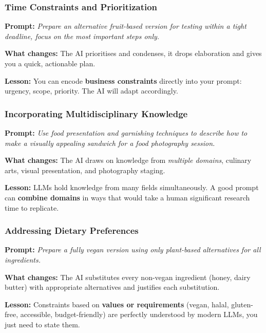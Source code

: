\begin{frame}[fragile]\frametitle{Time Constraints and Prioritization}

\textbf{Prompt:} \emph{Prepare an alternative fruit-based version for testing within a tight deadline, focus on the most important steps only.}

\medskip
\textbf{What changes:} The AI prioritises and condenses, it drops elaboration and gives you a quick, actionable plan.

\medskip
\textbf{Lesson:} You can encode \textbf{business constraints} directly into your prompt: urgency, scope, priority. The AI will adapt accordingly.

\end{frame}

\begin{frame}[fragile]\frametitle{Incorporating Multidisciplinary Knowledge}

\textbf{Prompt:} \emph{Use food presentation and garnishing techniques to describe how to make a visually appealing sandwich for a food photography session.}

\medskip
\textbf{What changes:} The AI draws on knowledge from \emph{multiple domains}, culinary arts, visual presentation, and photography staging.

\medskip
\textbf{Lesson:} LLMs hold knowledge from many fields simultaneously. A good prompt can \textbf{combine domains} in ways that would take a human significant research time to replicate.

\end{frame}

\begin{frame}[fragile]\frametitle{Addressing Dietary Preferences}

\textbf{Prompt:} \emph{Prepare a fully vegan version using only plant-based alternatives for all ingredients.}

\medskip
\textbf{What changes:} The AI substitutes every non-vegan ingredient (honey, dairy butter) with appropriate alternatives and justifies each substitution.

\medskip
\textbf{Lesson:} Constraints based on \textbf{values or requirements} (vegan, halal, gluten-free, accessible, budget-friendly) are perfectly understood by modern LLMs, you just need to state them.

\end{frame}

